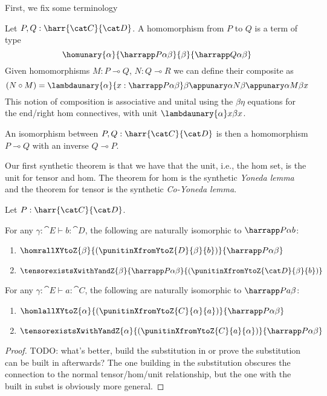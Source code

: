 First, we fix some terminology
\begin{lemma}
  Let $P, Q : \harr {\cat C} {\cat D}$.
  A homomorphism from $P$ to $Q$ is a term of type
  \[ \homunary {\alpha} {\harrapp P \alpha \beta} {\beta} {\harrapp Q \alpha \beta} \]
  Given homomorphisms $M : P \multimap Q$, $N : Q \multimap R$ we can define their composite as
  \[ (N \circ M) = \lambdaunary {\alpha} {x:\harrapp P \alpha \beta} \beta {\appunary \alpha N \beta {\appunary \alpha M \beta x}} \]
  This notion of composition is associative and unital using the
  $\beta\eta$ equations for the end/right hom connectives, with unit
  $\lambdaunary {\alpha} x \beta x$.

  An isomorphism between $P, Q : \harr {\cat C}{\cat D}$ is then a
  homomorphism $P \multimap Q$ with an inverse $Q \multimap P$.
\end{lemma}

Our first synthetic theorem is that we have that the unit, i.e., the
hom set, is the unit for tensor and hom.
%
The theorem for hom is the synthetic \emph{Yoneda lemma} and the
theorem for tensor is the synthetic \emph{Co-Yoneda lemma}.
\begin{lemma}
  \label{lem:yo-and-co-yo}
  Let $P : \harr {\cat C} {\cat D}$.

  For any $\gamma : \cat E \vdash b : \cat D$, the following are naturally isomorphic to $\harrapp P \alpha b$:
  \begin{enumerate}
  \item $\homrallXYtoZ {\beta} {(\punitinXfromYtoZ {D} {\beta} {b})} {\harrapp P {\alpha} {\beta}}$
  \item $\tensorexistsXwithYandZ {\beta} {\harrapp P \alpha {\beta}} {(\punitinXfromYtoZ {\cat D} {\beta} {b})}$
  \end{enumerate}

  For any $\gamma : \cat E \vdash a : \cat C$, the following are naturally isomorphic to $\harrapp P a \beta$:
  \begin{enumerate}
  \item $\homlallXYtoZ {{\alpha}} {(\punitinXfromYtoZ {C} {\alpha} {a})} {\harrapp P {{\alpha}} {\beta}}$
  \item $\tensorexistsXwithYandZ {\alpha} {(\punitinXfromYtoZ {C} {a} {\alpha})} {\harrapp P {\alpha}{\beta}}$
  \end{enumerate}
\end{lemma}
\begin{proof}
  TODO: what's better, build the substitution in or prove the
  substitution can be built in afterwards? The one building in the
  substitution obscures the connection to the normal tensor/hom/unit
  relationship, but the one with the built in subst is obviously more
  general.
\end{proof}

